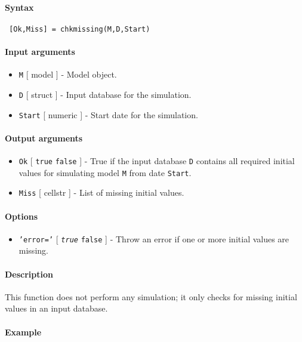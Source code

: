 


	\paragraph{Syntax}
 
 \begin{verbatim}
 [Ok,Miss] = chkmissing(M,D,Start)
 \end{verbatim}
 
 \paragraph{Input arguments}
 
 \begin{itemize}
 \item
   \texttt{M} {[} model {]} - Model object.
 \item
   \texttt{D} {[} struct {]} - Input database for the simulation.
 \item
   \texttt{Start} {[} numeric {]} - Start date for the simulation.
 \end{itemize}
 
 \paragraph{Output arguments}
 
 \begin{itemize}
 \item
   \texttt{Ok} {[} \texttt{true} \textbar{} \texttt{false} {]} - True if
   the input database \texttt{D} contains all required initial values for
   simulating model \texttt{M} from date \texttt{Start}.
 \item
   \texttt{Miss} {[} cellstr {]} - List of missing initial values.
 \end{itemize}
 
 \paragraph{Options}
 
 \begin{itemize}
 \item
   \texttt{'error='} {[} \emph{\texttt{true}} \textbar{} \texttt{false}
   {]} - Throw an error if one or more initial values are missing.
 \end{itemize}
 
 \paragraph{Description}
 
 This function does not perform any simulation; it only checks for
 missing initial values in an input database.
 
 \paragraph{Example}


